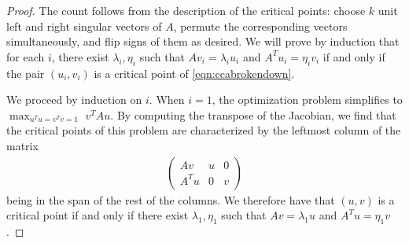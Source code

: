 \documentclass[12pt]{extarticle}
\theoremstyle{definition}
\numberwithin{theorem}{section}
\begin{document}
\begin{proof}
    The count follows from the description of the critical points: choose $k$ unit left and right singular vectors of $A$, permute the corresponding vectors simultaneously, and flip  signs of them as desired. 
    We will prove by induction that for each $i$, there exist $\lambda_i, \eta_i$ such that $Av_i = \lambda_i u_i$ and $A^T u_i = \eta_i v_i$ if and only if the pair $(u_i, v_i)$ is a critical point of \eqref{eqn:ccabrokendown}. 
    
    We proceed by induction on $i$.
    When $i = 1$, the optimization problem simplifies to 
    $\max_{u^Tu = v^Tv = 1} \,\, v^TAu.$
    By computing the transpose of the Jacobian, we find that the critical points of this problem are characterized by the leftmost column of the matrix
    \begin{align*}
        \begin{pmatrix}
            Av & u & 0\\
            A^T u & 0  & v
        \end{pmatrix}
    \end{align*}
    being in the span of the rest of the columns. 
    We therefore have that $(u,v)$ is a critical point if and only if there exist $\lambda_1, \eta_1$ such that $Av = \lambda_1 u$ and $A^Tu = \eta_1 v$. 


\end{proof}
\end{document}
